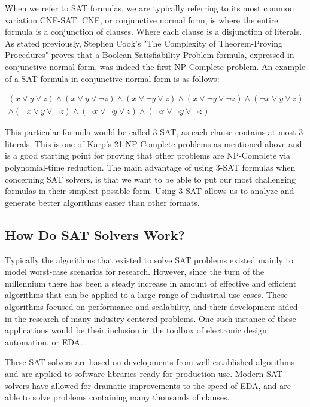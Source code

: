 \documentclass{article}
\begin{document}
When we refer to SAT formulas, we are typically referring to its most common variation CNF-SAT. CNF, or conjunctive normal form, is where
the entire formula is a conjunction of clauses. Where each clause is a disjunction of literals. As stated previously, Stephen Cook's "The
Complexity of Theorem-Proving Procedures" proves that a Boolean Satisfiability Problem formula, expressed in conjunctive normal form, was
indeed the first NP-Complete problem\cite{scook}. An example of a SAT formula in conjunctive normal form is as follows:

\begin{gather*}
    (x\vee y\vee z)\wedge (x\vee y\vee \neg z)\wedge (x\vee \neg y\vee z)\wedge(x\vee \neg y\vee \neg z)\wedge(\neg x\vee y\vee
    z) \\ \wedge(\neg x\vee y\vee \neg z)\wedge(\neg x\vee \neg y\vee z)\wedge(\neg x\vee \neg y\vee \neg z)
\end{gather*}

This particular formula would be called 3-SAT, as each clause contains at most 3 literals. This is one of Karp's 21 NP-Complete problems as
mentioned above and is a good starting point for proving that other problems are NP-Complete via polynomial-time reduction. The main
advantage of using 3-SAT formulas when concerning SAT solvers, is that we want to be able to put our most challenging formulas in their
simplest possible form. Using 3-SAT allows us to analyze and generate better algorithms easier than other formats.

\subsection{How Do SAT Solvers Work?}
Typically the algorithms that existed to solve SAT problems existed mainly to model worst-case scenarios for research. However, since the
turn of the millennium there has been a steady increase in amount of effective and efficient algorithms that can be applied to a large
range of industrial use cases. These algorithms focused on performance and scalability, and their development aided in the research of
many industry centered problems. One such instance of these applications would be their inclusion in the toolbox of electronic design
automation, or EDA.

These SAT solvers are based on developments from well established algorithms and are applied to software libraries ready for production use.
Modern SAT solvers have allowed for dramatic improvements to the speed of EDA, and are able to solve problems containing many thousands of
clauses\cite{sat}.
\end{document}
